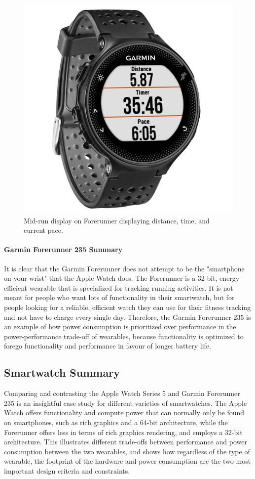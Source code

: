 \begin{figure}[h]
    \centering
    \includegraphics[scale=0.25]{media/garmin_running.jpg}
    \caption{Mid-run display on Forerunner displaying distance, time, and current pace.}
    \label{fig:garm_disp}
\end{figure}

\paragraph{Garmin Forerunner 235 Summary}
It is clear that the Garmin Forerunner does not attempt to be the "smartphone on your wrist" that the Apple
Watch does. The Forerunner is a 32-bit, energy efficient wearable that is specialized for tracking running
activities. It is not meant for people who want lots of functionality in their smartwatch, but for people
looking for a reliable, efficient watch they can use for their fitness tracking and not have to charge every
single day. Therefore, the Garmin Forerunner 235 is an example of how power consumption is prioritized over
performance in the power-performance trade-off of wearables, because functionality is optimized to
forego functionality and performance in favour of longer battery life.

\subsection{Smartwatch Summary}
Comparing and contrasting the Apple Watch Series 5 and Garmin Forerunner 235 is an insightful case study
for different varieties of smartwatches. The Apple Watch offers functionality and compute power 
that can normally only be found on smartphones, such as rich graphics and a 64-bit architecture, while
the Forerunner offers less in terms of rich graphics rendering, and employs a 32-bit architecture.
This illustrates different trade-offs between performance and power consumption between the 
two wearables, and shows how regardless of the type of wearable, the footprint of the hardware and
power consumption are the two most important design criteria and constraints.